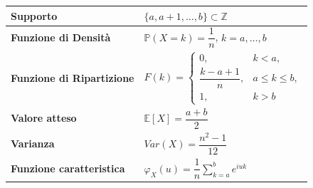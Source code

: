 \begin{figure}[H]
\begin{minipage}{0.45\textwidth}

\end{minipage}

\end{figure}

\bigskip
\begin{table}[H]
\centering
\renewcommand{\arraystretch}{2}
\begin{tabular}{@{}ll@{}}
\toprule
\textbf{Supporto} 
& $\{a, a+1, \dots, b\}\subset\mathbb{Z}$ \\

\midrule

\textbf{Funzione di Densità} 
& $\mathbb{P}(X=k)=\dfrac{1}{n}$, \quad $k=a,\dots,b$ \\

\midrule

\textbf{Funzione di Ripartizione}
& $F(k) = 
\begin{cases}
0, & k < a,\\[4pt]
\dfrac{k-a+1}{n}, & a \le k \le b,\\[6pt]
1, & k > b
\end{cases}$ \\[6pt]

\midrule

\textbf{Valore atteso} 
& $\mathbb{E}[X] = \dfrac{a+b}{2}$ \\

\midrule

\textbf{Varianza}
& $Var(X) = \dfrac{n^2 - 1}{12}$ \\

\midrule

\textbf{Funzione caratteristica}
& $\varphi_X(u) = \dfrac{1}{n} \displaystyle\sum_{k=a}^b e^{iuk}$ \\

\bottomrule
\end{tabular}
\end{table}